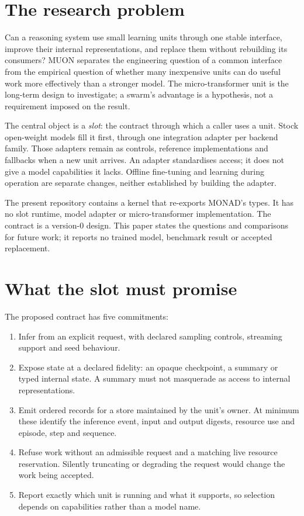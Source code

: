 \section{The research problem}

Can a reasoning system use small learning units through one stable interface, improve their internal representations, and replace them without rebuilding its consumers? MUON separates the engineering question of a common interface from the empirical question of whether many inexpensive units can do useful work more effectively than a stronger model. The micro-transformer unit is the long-term design to investigate; a swarm's advantage is a hypothesis, not a requirement imposed on the result.

The central object is a \emph{slot}: the contract through which a caller uses a unit. Stock open-weight models fill it first, through one integration adapter per backend family. Those adapters remain as controls, reference implementations and fallbacks when a new unit arrives. An adapter standardises access; it does not give a model capabilities it lacks. Offline fine-tuning and learning during operation are separate changes, neither established by building the adapter.

The present repository contains a kernel that re-exports MONAD's types. It has no slot runtime, model adapter or micro-transformer implementation. The contract is a version-0 design. This paper states the questions and comparisons for future work; it reports no trained model, benchmark result or accepted replacement.

\section{What the slot must promise}

The proposed contract has five commitments:
\begin{enumerate}
\item Infer from an explicit request, with declared sampling controls, streaming support and seed behaviour.
\item Expose state at a declared fidelity: an opaque checkpoint, a summary or typed internal state. A summary must not masquerade as access to internal representations.
\item Emit ordered records for a store maintained by the unit's owner. At minimum these identify the inference event, input and output digests, resource use and episode, step and sequence.
\item Refuse work without an admissible request and a matching live resource reservation. Silently truncating or degrading the request would change the work being accepted.
\item Report exactly which unit is running and what it supports, so selection depends on capabilities rather than a model name.
\end{enumerate}

